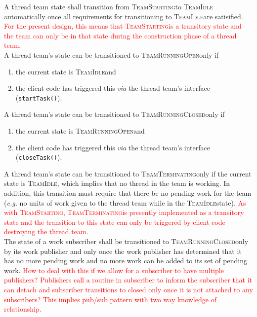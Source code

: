 \documentclass{article}
\newcommand{\TeamStarting}      {\textsc{TeamStarting}}
\newcommand{\TeamIdle}          {\textsc{TeamIdle}}
\newcommand{\TeamRunningOpen}   {\textsc{TeamRunningOpen}}
\newcommand{\TeamRunningClosed} {\textsc{TeamRunningClosed}}
\newcommand{\TeamTerminating}   {\textsc{TeamTerminating}}
\begin{document}
A thread team state shall transition from \TeamStarting to \TeamIdle
automatically once all requirements for transitioning to \TeamIdle are
satisified.  \textcolor{red}{For the present design, this means that
\TeamStarting is a transitory state and the team can only be in that state
during the construction phase of a thread team.}\\

A thread team's state can be transitioned to \TeamRunningOpen only if
\begin{enumerate}
\item{the current state is \TeamIdle and}
\item{the client code has triggered this \textit{via} the thread team's
interface (\texttt{startTask()}).}
\end{enumerate}

A thread team's state can be transitioned to \TeamRunningClosed only if
\begin{enumerate}
\item{the current state is \TeamRunningOpen and}
\item{the client code has triggered this \textit{via} the thread team's
interface (\texttt{closeTask()}).}
\end{enumerate}

A thread team's state can be transitioned to \TeamTerminating only if the
current state is \TeamIdle, which implies that no thread in the team is working.
In addition, this transition must require that there be no pending work for the
team (\textit{e.g.} no units of work given to the thread team while in the
\TeamIdle state).  \textcolor{red}{As with \TeamStarting, \TeamTerminating is
presently implemented as a transitory state and the transition to this state can
only be triggered by client code destroying the thread team}.\\

The state of a work subscriber shall be transitioned to \TeamRunningClosed only
by its work publisher and only once the work publisher has determined that it
has no more pending work and no more work can be added to its set of pending
work.  \textcolor{red}{How to deal with this if we allow for a subscriber to
have multiple publishers?  Publishers call a routine in subscriber to inform the
subscriber that it can detach and subscriber transitions to closed only once it
is not attached to any subscribers?  This implies pub/sub pattern with two way
knowledge of relationship.}\\
\end{document}
